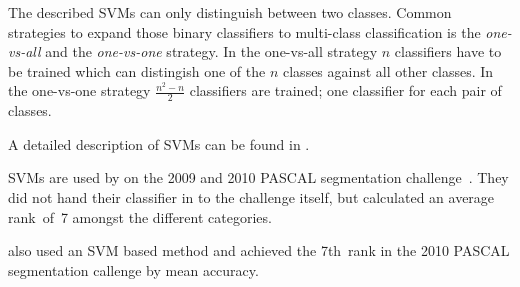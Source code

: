 The described \glspl{SVM} can only distinguish between two classes. Common
strategies to expand those binary classifiers to multi-class classification is
the \textit{one-vs-all} and the \textit{one-vs-one} strategy. In the one-vs-all
strategy $n$ classifiers have to be trained which can distingish one of the $n$
classes against all other classes. In the one-vs-one strategy $\frac{n^2 - n}{2}$
classifiers are trained; one classifier for each pair of classes.

A detailed description of \glspl{SVM} can be found in \cite{burges1998tutorial}.

\Glspl{SVM} are used by \cite{yang2012layered} on the 2009 and 2010 PASCAL
segmentation challenge~\cite{everingham2010pascal}. They did not hand their
classifier in to the challenge itself, but calculated an average rank~of~7
amongst the different categories.

\cite{felzenszwalb2010object} also used an SVM based method and achieved the
7th~rank in the 2010 PASCAL segmentation callenge by mean accuracy.